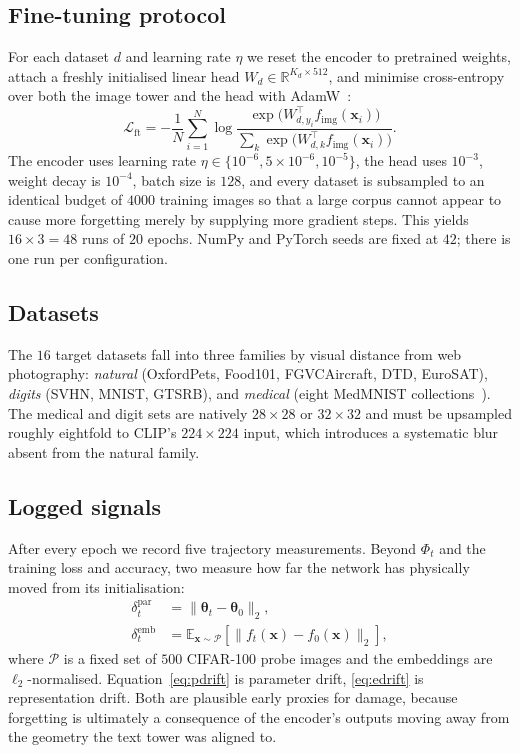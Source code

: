 \documentclass[manuscript,nonacm]{acmart}
\begin{document}
\subsection{Fine-tuning protocol}
For each dataset $d$ and learning rate $\eta$ we reset the encoder to pretrained
weights, attach a freshly initialised linear head $W_d\in\mathbb{R}^{K_d\times512}$, and
minimise cross-entropy over both the image tower and the head with
AdamW~\cite{loshchilov2019adamw}:
\begin{equation}
\mathcal{L}_{\mathrm{ft}}
 = -\frac{1}{N}\sum_{i=1}^{N}\log
   \frac{\exp\!\big(W_{d,y_i}^{\!\top} f_{\mathrm{img}}(\mathbf{x}_i)\big)}
        {\sum_{k}\exp\!\big(W_{d,k}^{\!\top} f_{\mathrm{img}}(\mathbf{x}_i)\big)} .
\label{eq:finetune}
\end{equation}
The encoder uses learning rate $\eta\in\{10^{-6},5\times10^{-6},10^{-5}\}$, the head
uses $10^{-3}$, weight decay is $10^{-4}$, batch size is $128$, and every dataset is
subsampled to an identical budget of $4000$ training images so that a large corpus
cannot appear to cause more forgetting merely by supplying more gradient steps. This
yields $16\times3=48$ runs of $20$ epochs. NumPy and PyTorch seeds are fixed at $42$;
there is one run per configuration.

\subsection{Datasets}
The $16$ target datasets fall into three families by visual distance from web
photography: \emph{natural} (OxfordPets, Food101, FGVCAircraft, DTD, EuroSAT),
\emph{digits} (SVHN, MNIST, GTSRB), and \emph{medical} (eight MedMNIST
collections~\cite{yang2023medmnist}). The medical and digit sets are natively $28\times28$
or $32\times32$ and must be upsampled roughly eightfold to CLIP's $224\times224$ input,
which introduces a systematic blur absent from the natural family.

\subsection{Logged signals}
After every epoch we record five trajectory measurements. Beyond $\Phi_t$ and the training loss and
accuracy, two measure how far the network has physically moved from its initialisation:
\begin{align}
\delta^{\mathrm{par}}_t &= \lVert \boldsymbol{\theta}_t-\boldsymbol{\theta}_0\rVert_2,
                                \label{eq:pdrift}\\[2pt]
\delta^{\mathrm{emb}}_t &= \mathbb{E}_{\mathbf{x}\sim\mathcal{P}}
   \left[\lVert f_t(\mathbf{x})-f_0(\mathbf{x})\rVert_2\right], \label{eq:edrift}
\end{align}
where $\mathcal{P}$ is a fixed set of $500$ CIFAR-100 probe images and the embeddings
are $\ell_2$-normalised. Equation~\eqref{eq:pdrift}
is parameter drift, \eqref{eq:edrift} is representation drift. Both are plausible early
proxies for damage, because forgetting is ultimately a consequence of the encoder's
outputs moving away from the geometry the text tower was aligned to.
\end{document}
